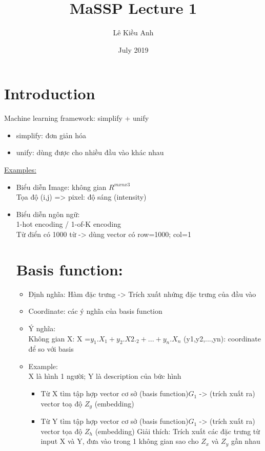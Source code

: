 \documentclass{article}
\title{MaSSP Lecture 1}
\date{July 2019}
\begin{document}
\maketitle
\author{Lê Kiều Anh}
\section{Introduction}
Machine learning framework: simplify + unify 
\begin{itemize}
    \item simplify: đơn giản hóa
    \item unify: dùng được cho nhiều đầu vào khác nhau
\end{itemize}
\underline{Examples:}
\begin{itemize}
    \item Biểu diễn Image: không gian $R^{mxnx3}$
    \\ Tọa độ (i,j) => pixel: độ sáng (intensity)
    \item Biểu diễn ngôn ngữ: 
    \\ 1-hot encoding / 1-of-K encoding
     \\ Từ điển có 1000 từ -> dùng vector có row=1000; col=1 

\section{Basis function:}
\begin{itemize}
    \item Định nghĩa: Hàm đặc trưng -> Trích xuất nhứng đặc trưng của đầu vào
    \item Coordinate: các ý nghĩa của basis function
    \item Ý nghĩa:
    \\ Không gian X: X =$y_{1}.X_{1} + y_{2}.X2._{2} +... +y_{n}.X_{n}$
(y1,y2,...,yn): coordinate để so với basis

    \item Example:
    \\X là hình 1 người; Y là description của bức hình
    \begin{itemize}
        \item Từ X tìm tập hợp vector cơ sở (basis function)$G_{1}$ -> (trích  xuất ra) vector toạ độ $Z_{g}$ (embedding)
        \item Từ Y tìm tập hợp vector cơ sở (basis function)$G_{1}$ -> (trích  xuất ra) vector tọa độ  $Z_{h}$ (embedding)
Giải thích: Trích xuất các đặc trưng từ input X và Y, đưa vào trong 1 không gian sao cho $Z_{x}$ và $Z_{y}$ gần nhau
    \end{itemize}
\end{itemize}    


\end{itemize}
\end{document}
